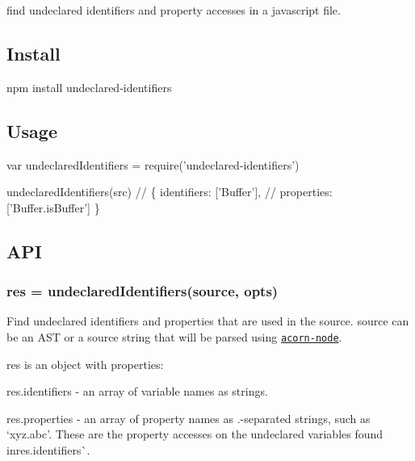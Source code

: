 find undeclared identifiers and property accesses in a javascript file.

\href{https://www.npmjs.com/package/undeclared-identifiers}{\tt } \href{https://travis-ci.org/goto-bus-stop/undeclared-identifiers}{\tt } \href{http://npm.im/standard}{\tt }

\subsection*{Install}


\begin{DoxyCode}
npm install undeclared-identifiers
\end{DoxyCode}


\subsection*{Usage}


\begin{DoxyCode}
var undeclaredIdentifiers = require('undeclared-identifiers')

undeclaredIdentifiers(src)
// \{ identifiers: ['Buffer'],
//   properties: ['Buffer.isBuffer'] \}
\end{DoxyCode}


\subsection*{A\+PI}

\subsubsection*{{\ttfamily res = undeclared\+Identifiers(source, opts)}}

Find undeclared identifiers and properties that are used in the {\ttfamily source}. {\ttfamily source} can be an A\+ST or a source string that will be parsed using \href{https://github.com/browserify/acorn-node}{\tt acorn-\/node}.

{\ttfamily res} is an object with properties\+:


\begin{DoxyItemize}
\item {\ttfamily res.\+identifiers} -\/ an array of variable names as strings.
\item {\ttfamily res.\+properties} -\/ an array of property names as .-\/separated strings, such as `\textquotesingle{}xyz.\+abc'{\ttfamily . These are the property accesses on the undeclared variables found in}res.\+identifiers\`{}.
\end{DoxyItemize}


